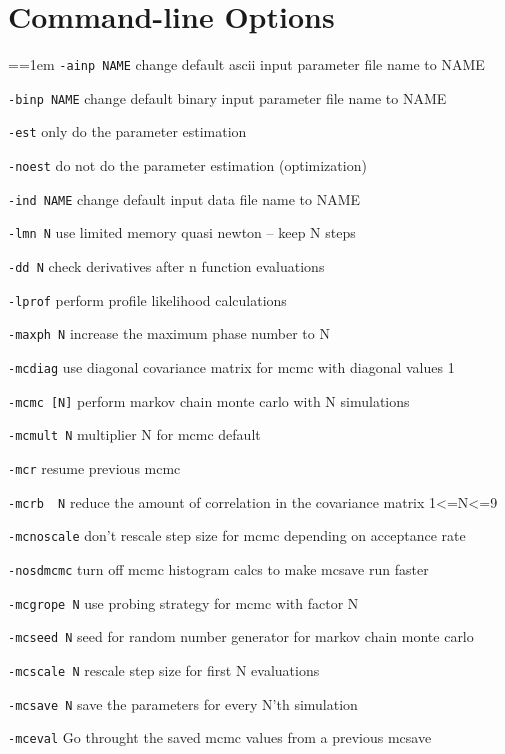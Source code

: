 \documentclass[a4paper,10pt,notumble]{leaflet}
\begin{document}
\section{Command-line Options}
\par{\tiny\everypar={\hangindent=1em }
\verb|-ainp NAME|      change default ascii input parameter file name to NAME

\verb|-binp NAME|      change default binary input parameter file name to NAME

\verb|-est|            only do the parameter estimation

\verb|-noest|          do not do the parameter estimation (optimization) 

\verb|-ind NAME|       change default input data file name to NAME

\verb|-lmn N|          use limited memory quasi newton -- keep N steps

\verb|-dd N|           check derivatives after n function evaluations

\verb|-lprof|          perform profile likelihood calculations

\verb|-maxph N|        increase the maximum phase number to N

\verb|-mcdiag|         use diagonal covariance matrix for mcmc with diagonal values 1

\verb|-mcmc [N]|       perform markov chain monte carlo with N simulations

\verb|-mcmult N|       multiplier N for mcmc default

\verb|-mcr|            resume previous mcmc

\verb|-mcrb  N|        reduce the amount of correlation in the covariance matrix 1<=N<=9

\verb|-mcnoscale|      don't rescale step size for mcmc depending on acceptance rate

\verb|-nosdmcmc|       turn off mcmc histogram calcs to make mcsave run faster

\verb|-mcgrope N|      use probing strategy for mcmc with factor N

\verb|-mcseed N|       seed for random number generator for markov chain monte carlo

\verb|-mcscale N|       rescale step size for first N evaluations

\verb|-mcsave N|       save the parameters for every N'th simulation

\verb|-mceval|         Go throught the saved mcmc values from a previous mcsave

}
\end{document}
